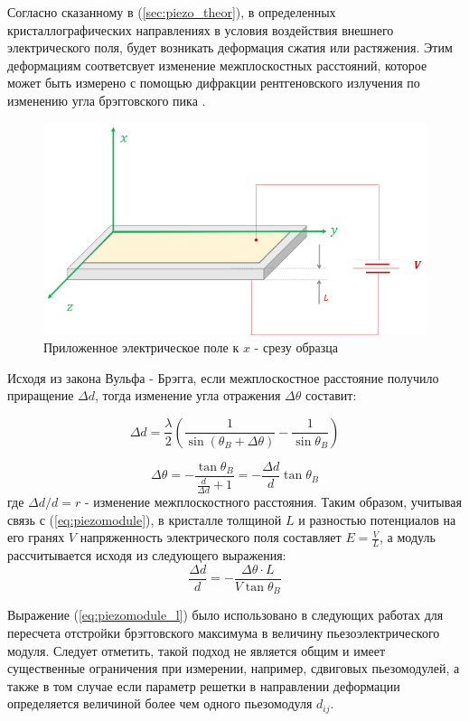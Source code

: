 \label{sec:pieao_method}
Согласно сказанному в (\ref{sec:piezo_theor}), в определенных кристаллографических направлениях в
условия воздействия внешнего электрического поля, будет возникать деформация
сжатия или растяжения. Этим деформациям соответсвует изменение межплоскостных
 расстояний, которое может быть измерено с помощью дифракции рентгеновского
 излучения по изменению угла брэгговского пика \cite{marchenkov2014}.

 \begin{figure}[H]
   \centering
   \includegraphics[width=.4\textwidth]{images/piezo.png}
   \caption{Приложенное электрическое поле к $x$ - срезу образца}
   \label{ris:x_cut}
 \end{figure}

Исходя из закона Вульфа - Брэгга, если межплоскостное расстояние получило приращение
$\Delta d$, тогда изменение угла отражения $\Delta \theta$ составит:

$$ \Delta d = \frac{\lambda}{2}\left( \frac{1}{\sin(\theta_B + \Delta \theta) } - \frac{1}{\sin \theta_B } \right) $$

\begin{equation}
   \Delta \theta =-  \frac{\tan \theta_B}{\frac{d}{\Delta d}+1}  = -  \frac{\Delta d }{d}  \tan \theta_B
\end{equation}
\noindent
где $\Delta d/d = r$ - изменение межплоскостного расстояния. Таким образом, учитывая связь с
(\ref{eq:piezomodule}),  в кристалле толщиной $L$ и разностью потенциалов на его
гранях $V$ напряженность электрического поля составляет $E = \frac{V}{L}$, а модуль
 рассчитывается исходя из следующего выражения:
 \begin{equation}
    \frac{\Delta d}{d}  = -\frac{\Delta \theta \cdot L}{V \tan \theta_B}
    \label{eq:piezomodule_l}
 \end{equation}

Выражение (\ref{eq:piezomodule_l}) было использовано в следующих работах
\cite{kibalin2015, marchenkov2014,piezo101,piezo102} для
пересчета отстройки брэгговского максимума в величину пьезоэлектрического модуля.
Следует отметить, такой подход не является общим и имеет существенные ограничения при
измерении, например, сдвиговых пьезомодулей, а также в том случае если параметр решетки
в направлении деформации определяется величиной более чем одного пьезомодуля $d_{ij}$.

